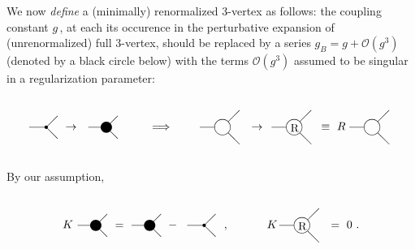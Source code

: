 \documentclass[a4paper,12pt]{article}
\begin{document}
We now \emph{define} a (minimally) renormalized 3-vertex as follows: the
coupling constant $g$\,, at each its occurence in the perturbative expansion
of (unrenormalized) full 3-vertex, should be replaced by a series
$g_B=g+\mathcal{O}(g^3)$ (denoted by a black circle below) with the terms
$\mathcal{O}(g^3)$ assumed to be singular in a regularization parameter:
\begin{equation}
\label{ren}
\parbox{1.2cm}{
\begin{picture}(30,60)
\put(20,30){\circle*{3}}
\put(5,30){\line(1,0){15}}
\put(20,30){\line(1,1){10}}
\put(20,30){\line(1,-1){10}}
\end{picture}
} \rightarrow \
\parbox{1.2cm}{
\begin{picture}(30,60)
\put(20,30){\circle*{10}}
\put(4,30){\line(1,0){15}}
\put(20,30){\line(1,1){10}}
\put(20,30){\line(1,-1){10}}
\end{picture}
} \ \ \ \ \ \ \ \Longrightarrow \ \ \ \ \ \ \
\parbox{1.5cm}{
\begin{picture}(35,60)
\put(20,30){\circle{14}}
\put(0,30){\line(1,0){13}}
\put(25,35){\line(1,1){10}}
\put(25,25){\line(1,-1){10}}
\end{picture}
} \rightarrow \ \,
\parbox{1.5cm}{
\begin{picture}(35,60)
\put(20,30){\circle{14}}
\put(0,30){\line(1,0){13}}
\put(25,35){\line(1,1){10}}
\put(25,25){\line(1,-1){10}}
\put(16.7,26){R}
\end{picture}
}\!\equiv \
R\
\parbox{1.5cm}{
\begin{picture}(35,60)
\put(20,30){\circle{14}}
\put(0,30){\line(1,0){13}}
\put(25,35){\line(1,1){10}}
\put(25,25){\line(1,-1){10}}
\end{picture}
}
\end{equation}
By our assumption,
\begin{equation}
\label{K1}
K
\parbox{1.2cm}{
\begin{picture}(30,60)
\put(20,30){\circle*{10}}
\put(4,30){\line(1,0){15}}
\put(20,30){\line(1,1){10}}
\put(20,30){\line(1,-1){10}}
\end{picture}
} =
\parbox{1.2cm}{
\begin{picture}(30,60)
\put(20,30){\circle*{10}}
\put(4,30){\line(1,0){15}}
\put(20,30){\line(1,1){10}}
\put(20,30){\line(1,-1){10}}
\end{picture}
} - \,
\parbox{1.2cm}{
\begin{picture}(30,60)
\put(20,30){\circle*{3}}
\put(5,30){\line(1,0){15}}
\put(20,30){\line(1,1){10}}
\put(20,30){\line(1,-1){10}}
\end{picture}
}\ , \ \ \ \ \ \ \ \ \ \
K \,
\parbox{1.5cm}{
\begin{picture}(35,60)
\put(20,30){\circle{14}}
\put(0,30){\line(1,0){13}}
\put(25,35){\line(1,1){10}}
\put(25,25){\line(1,-1){10}}
\put(16.7,26){R}
\end{picture}
} = \ 0\ .
\end{equation}
\end{document}
